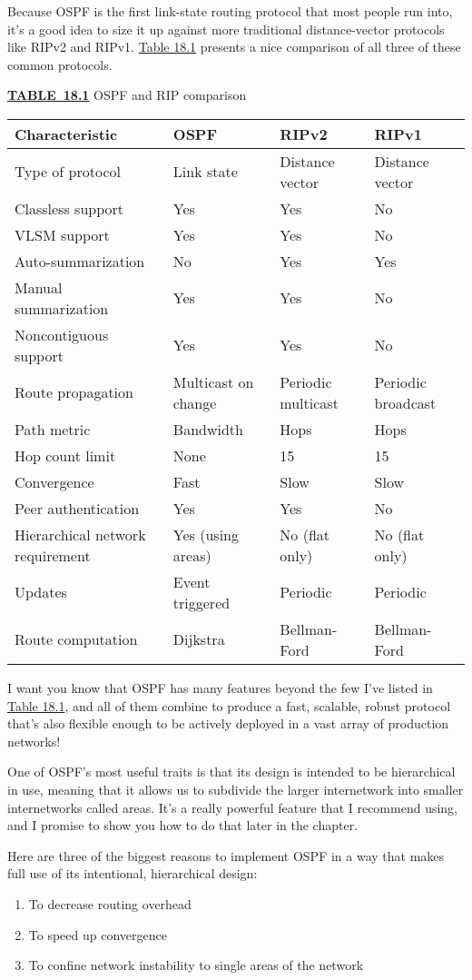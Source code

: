 Because OSPF is the first link-state routing protocol that most people
run into, it's a good idea to size it up against more traditional
distance-vector protocols like RIPv2 and RIPv1.
\protect\hyperlink{c18.xhtmlux5cux23table18-1}{Table 18.1} presents a
nice comparison of all three of these common protocols.

{\protect\hyperlink{c18.xhtmlux5cux23tableanchor18-1}{\textbf{TABLE~18.1}}
OSPF and RIP comparison}

\begin{longtable}[]{@{}llll@{}}
\toprule
Characteristic & OSPF & RIPv2 & RIPv1\tabularnewline
\midrule
\endhead
Type of protocol & Link state & Distance vector & Distance
vector\tabularnewline
Classless support & Yes & Yes & No\tabularnewline
VLSM support & Yes & Yes & No\tabularnewline
Auto-summarization & No & Yes & Yes\tabularnewline
Manual summarization & Yes & Yes & No\tabularnewline
Noncontiguous support & Yes & Yes & No\tabularnewline
Route propagation & Multicast on change & Periodic multicast & Periodic
broadcast\tabularnewline
Path metric & Bandwidth & Hops & Hops\tabularnewline
Hop count limit & None & 15 & 15\tabularnewline
Convergence & Fast & Slow & Slow\tabularnewline
Peer authentication & Yes & Yes & No\tabularnewline
Hierarchical network requirement & Yes (using areas) & No (flat only) &
No (flat only)\tabularnewline
Updates & Event triggered & Periodic & Periodic\tabularnewline
Route computation & Dijkstra & Bellman-Ford &
Bellman-Ford\tabularnewline
\bottomrule
\end{longtable}

I want you know that OSPF has many features beyond the few I've listed
in \protect\hyperlink{c18.xhtmlux5cux23table18-1}{Table 18.1}, and all
of them combine to produce a fast, scalable, robust protocol that's also
flexible enough to be actively deployed in a vast array of production
networks!

One of OSPF's most useful traits is that its design is intended to be
hierarchical in use, meaning that it allows us to subdivide the larger
internetwork into smaller internetworks
\protect\hypertarget{c18.xhtmlux5cux23Page_748}{}{}called areas. It's a
really powerful feature that I recommend using, and I promise to show
you how to do that later in the chapter.

Here are three of the biggest reasons to implement OSPF in a way that
makes full use of its intentional, hierarchical design:

\begin{enumerate}
\tightlist
\item
  To decrease routing overhead
\item
  To speed up convergence
\item
  To confine network instability to single areas of the network
\end{enumerate}

